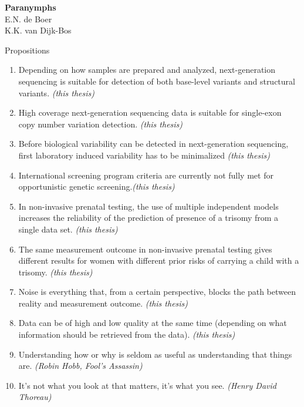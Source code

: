\clearpage



\clearpage

\noindent
\textbf{Paranymphs}\\
E.N. de Boer\\
K.K. van Dijk-Bos\\

\clearpage
\null\newpage

\noindent
	\Large
Propositions

\small

\begin{enumerate}
	
	\item Depending on how samples are prepared and analyzed, next-generation sequencing is suitable for detection of both base-level variants and structural variants. \textsl{(this thesis)}
	
	\item High coverage next-generation sequencing data is suitable for single-exon copy number variation detection. \textsl{(this thesis)}
	
	\item Before biological variability can be detected in next-generation sequencing, first laboratory induced variability has to be minimalized \textsl{(this thesis)}
	
	\item International screening program criteria  are currently not fully met for opportunistic genetic screening.\textsl{(this thesis)}
	
	\item In non-invasive prenatal testing, the use of multiple independent models increases the reliability of  the prediction of presence of a trisomy from a single data set. \textsl{(this thesis)}
	
	\item The same measurement outcome in non-invasive prenatal testing gives different results for women with different prior risks of carrying a child with a trisomy. \textsl{(this thesis)}
	
	\item Noise is everything that, from a certain perspective, blocks the path between reality and measurement outcome. \textsl{(this thesis)}
	
	\item Data can be of high and low quality at the same time (depending on what information should be retrieved from the data). \textsl{(this thesis)}
	
	\item Understanding how or why is seldom as useful as understanding that things are. \textsl{(Robin Hobb, Fool's Assassin)}
	
	\item It’s not what you look at that matters, it’s what you see. \textsl{(Henry David Thoreau)}
	
\end{enumerate}

\clearpage
\null\newpage